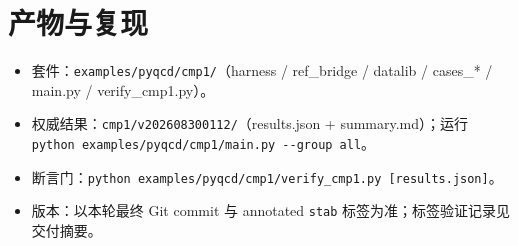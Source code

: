 \documentclass[10.5pt]{ctexart}
\begin{document}
\section{产物与复现}
\begin{itemize}
\item 套件：\verb|examples/pyqcd/cmp1/|（harness / ref\_bridge / datalib / cases\_* / main.py / verify\_cmp1.py）。
\item 权威结果：\verb|cmp1/v202608300112/|（results.json + summary.md）；运行 \verb|python examples/pyqcd/cmp1/main.py --group all|。
\item 断言门：\verb|python examples/pyqcd/cmp1/verify_cmp1.py [results.json]|。
\item 版本：以本轮最终 Git commit 与 annotated \verb|stab| 标签为准；标签验证记录见交付摘要。
\end{itemize}
\end{document}
